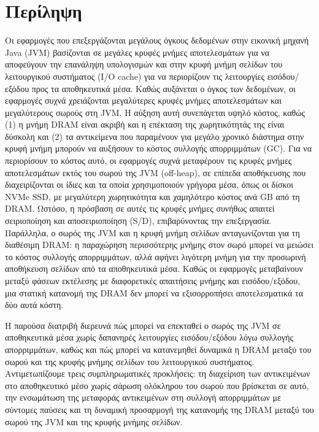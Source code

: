 \cleardoublepage


\chapter*{\selg{} {\selectfont Περίληψη}}

 {\selectfont \selg

  Οι εφαρμογές που επεξεργάζονται μεγάλους όγκους δεδομένων στην εικονική μηχανή \selam Java (JVM)\selg{} βασίζονται σε μεγάλες κρυφές μνήμες αποτελεσμάτων για να αποφεύγουν την επανάληψη υπολογισμών και στην κρυφή μνήμη σελίδων του λειτουργικού συστήματος (\selam I/O cache\selg) για να περιορίζουν τις λειτουργίες εισόδου/εξόδου προς τα αποθηκευτικά μέσα.
  Καθώς αυξάνεται ο όγκος των δεδομένων, οι εφαρμογές συχνά χρειάζονται μεγαλύτερες κρυφές μνήμες αποτελεσμάτων και μεγαλύτερους σωρούς στη \selam JVM\selg.
  Η αύξηση αυτή συνεπάγεται υψηλό κόστος, καθώς (1) η μνήμη \selam DRAM\selg{} είναι ακριβή και η επέκταση της χωρητικότητάς της είναι δύσκολη και (2) τα αντικείμενα που παραμένουν για μεγάλο χρονικό διάστημα στην κρυφή μνήμη μπορούν να αυξήσουν το κόστος συλλογής απορριμμάτων (\selam GC\selg).
  Για να περιορίσουν το κόστος αυτό, οι εφαρμογές συχνά μεταφέρουν τις κρυφές μνήμες αποτελεσμάτων εκτός του σωρού της \selam JVM\selg{} (\selam off-heap\selg), σε επίπεδα αποθήκευσης που διαχειρίζονται οι ίδιες και τα οποία χρησιμοποιούν γρήγορα μέσα, όπως οι δίσκοι \selam NVMe SSD\selg, με μεγαλύτερη χωρητικότητα και χαμηλότερο κόστος ανά \selam GB\selg{} από τη \selam DRAM\selg.
  Ωστόσο, η πρόσβαση σε αυτές τις κρυφές μνήμες συνήθως απαιτεί σειριοποίηση και αποσειριοποίηση (\selam S/D\selg), επιβαρύνοντας την επεξεργασία.
  Παράλληλα, ο σωρός της \selam JVM\selg{} και η κρυφή μνήμη σελίδων ανταγωνίζονται για τη διαθέσιμη \selam DRAM\selg: η παραχώρηση περισσότερης μνήμης στον σωρό μπορεί να μειώσει το κόστος συλλογής απορριμμάτων, αλλά αφήνει λιγότερη μνήμη για την προσωρινή αποθήκευση σελίδων από τα αποθηκευτικά μέσα.
  Καθώς οι εφαρμογές μεταβαίνουν μεταξύ φάσεων εκτέλεσης με διαφορετικές απαιτήσεις μνήμης και εισόδου/εξόδου, μια στατική κατανομή της \selam DRAM\selg{} δεν μπορεί να εξισορροπήσει αποτελεσματικά τα δύο αυτά κόστη.

  Η παρούσα διατριβή διερευνά πώς μπορεί να επεκταθεί ο σωρός της \selam JVM\selg{} σε αποθηκευτικά μέσα χωρίς δαπανηρές λειτουργίες εισόδου/εξόδου λόγω συλλογής απορριμμάτων, καθώς και πώς μπορεί να κατανεμηθεί δυναμικά η \selam DRAM\selg{} μεταξύ του σωρού και της κρυφής μνήμης σελίδων του λειτουργικού συστήματος.
  Αντιμετωπίζουμε τρεις συμπληρωματικές προκλήσεις: τη διαχείριση των αντικειμένων στο αποθηκευτικό μέσο χωρίς σάρωση ολόκληρου του σωρού που βρίσκεται σε αυτό, την ενσωμάτωση της μεταφοράς αντικειμένων στη συλλογή απορριμμάτων με σύντομες παύσεις και τη δυναμική προσαρμογή της κατανομής της \selam DRAM\selg{} μεταξύ του σωρού της \selam JVM\selg{} και της κρυφής μνήμης σελίδων.

}
